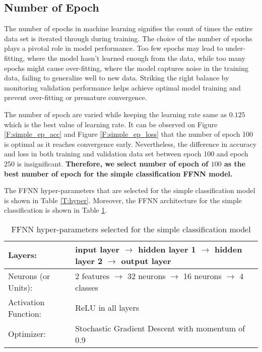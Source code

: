 \documentclass[12pt, a4paper, twoside]{article}
\begin{document}
\subsection{Number of Epoch}\label{SS:simple-ep}
The number of epochs in machine learning signifies the count of times the entire data set is iterated through during training. The choice of the number of epochs plays a pivotal role in model performance. Too few epochs may lead to under-fitting, where the model hasn't learned enough from the data, while too many epochs might cause over-fitting, where the model captures noise in the training data, failing to generalize well to new data. Striking the right balance by monitoring validation performance helps achieve optimal model training and prevent over-fitting or premature convergence.
\par
The number of epoch are varied while keeping the learning rate same as $0.125$ which is the best value of learning rate. It can be observed on Figure \ref{F:simple_ep_acc} and Figure \ref{F:simple_ep_loss} that the number of epoch 100 is optimal as it reaches convergence early. Nevertheless, the difference in accuracy and loss in both training and validation data set between epoch 100 and epoch 250 is insignificant. \textbf{Therefore, we select number of epoch of $100$ as the best number of epoch for the simple classification FFNN model.}
\par
The FFNN hyper-parameters that are selected for the simple classification model is shown in Table \ref{T:hyper}. Moreover, the FFNN architecture for the simple classification is shown in Table \ref{T:simple}.
\begin{table}[ht]
	\begin{center}
		\begin{tabular}{l l}
			\hline
			Layers: & input layer $\longrightarrow$ hidden layer 1 $\longrightarrow$ hidden layer 2 $\longrightarrow$ output layer \\ \hline
			Neurons (or Units): & 2 features $\longrightarrow$ 32 neurons $\longrightarrow$ 16 neurons $\longrightarrow$ 4 classes \\ \hline
			Activation Function: & ReLU in all layers\\ \hline
			Optimizer: & Stochastic Gradient Descent with momentum of 0.9 \\ \hline
		\end{tabular}
		\caption{FFNN hyper-parameters selected for the simple classification  model}\label{T:simple}
	\end{center}
\end{table}
\end{document}
